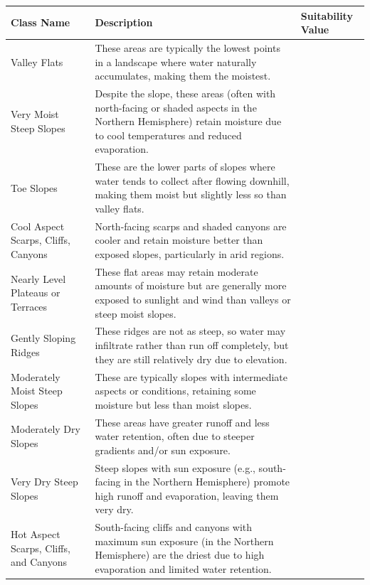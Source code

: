\documentclass[
  number,
  preprint,
  3p,
  onecolumn]{elsarticle}
\begin{document}
\begin{longtable}[]{@{}
  >{\raggedright\arraybackslash}p{}
  >{\raggedright\arraybackslash}p{}
  >{\raggedright\arraybackslash}p{}@{}}
\toprule\noalign{}
\begin{minipage}[b]{\linewidth}\raggedright
Class Name
\end{minipage} & \begin{minipage}[b]{\linewidth}\raggedright
Description
\end{minipage} & \begin{minipage}[b]{\linewidth}\raggedright
Suitability Value
\end{minipage} \\
\midrule\noalign{}
\endhead
\bottomrule\noalign{}
\endlastfoot
Valley Flats & These areas are typically the lowest points in a
landscape where water naturally accumulates, making them the moistest. &
10 \\
Very Moist Steep Slopes & Despite the slope, these areas (often with
north-facing or shaded aspects in the Northern Hemisphere) retain
moisture due to cool temperatures and reduced evaporation. & 9 \\
Toe Slopes & These are the lower parts of slopes where water tends to
collect after flowing downhill, making them moist but slightly less so
than valley flats. & 8 \\
Cool Aspect Scarps, Cliffs, Canyons & North-facing scarps and shaded
canyons are cooler and retain moisture better than exposed slopes,
particularly in arid regions. & 7 \\
Nearly Level Plateaus or Terraces & These flat areas may retain moderate
amounts of moisture but are generally more exposed to sunlight and wind
than valleys or steep moist slopes. & 6 \\
Gently Sloping Ridges & These ridges are not as steep, so water may
infiltrate rather than run off completely, but they are still relatively
dry due to elevation. & 5 \\
Moderately Moist Steep Slopes & These are typically slopes with
intermediate aspects or conditions, retaining some moisture but less
than moist slopes. & 4 \\
Moderately Dry Slopes & These areas have greater runoff and less water
retention, often due to steeper gradients and/or sun exposure. & 3 \\
Very Dry Steep Slopes & Steep slopes with sun exposure (e.g.,
south-facing in the Northern Hemisphere) promote high runoff and
evaporation, leaving them very dry. & 2 \\
Hot Aspect Scarps, Cliffs, and Canyons & South-facing cliffs and canyons
with maximum sun exposure (in the Northern Hemisphere) are the driest
due to high evaporation and limited water retention. & 1 \\
\end{longtable}
\end{document}
